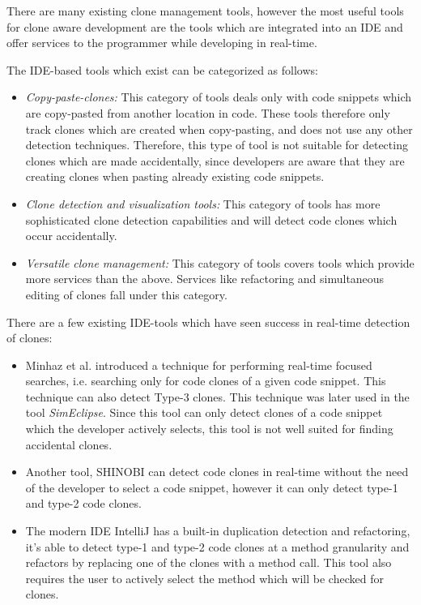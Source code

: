 \documentclass[12pt]{article}
\begin{document}
There are many existing clone management tools, however the most useful tools for clone
aware development are the tools which are integrated into an IDE and offer services to the
programmer while developing in real-time.

The IDE-based tools which exist can be categorized as
follows\cite[8]{Udding_Towards_Convenient_Management}:

\begin{itemize}
	\item\textit{Copy-paste-clones:} This category of tools deals only with code snippets which are
	copy-pasted from another location in code. These tools therefore only track clones which
	are created when copy-pasting, and does not use any other detection techniques. Therefore,
	this type of tool is not suitable for detecting clones which are made accidentally, since
	developers are aware that they are creating clones when pasting already existing code
	snippets.

	\item\textit{Clone detection and visualization tools:} This category of tools has more
	sophisticated clone detection capabilities and will detect code clones which occur
	accidentally.

	\item\textit{Versatile clone management:} This category of tools covers tools which provide more
	services than the above. Services like refactoring and simultaneous editing of clones fall
	under this category.
\end{itemize}

There are a few existing IDE-tools which have seen success in real-time detection of clones:

\begin{itemize}
	\item Minhaz et al. introduced a technique for performing real-time focused
	      searches, i.e. searching only for code clones of a given code snippet. This
	      technique can also detect Type-3 clones\cite{Zibran_real_time_search}.
	      This technique was later used in the tool
	      \textit{SimEclipse}\cite{Udding_Towards_Convenient_Management}. Since this tool
	      can only detect clones of a code snippet which the developer actively selects, this tool is
	      not well suited for finding accidental clones.

	\item Another tool, SHINOBI can detect code clones in real-time without the need
	      of the developer to select a code snippet, however it can only detect type-1
	      and type-2 code clones\cite{SHINOBI}.
	\item The modern IDE IntelliJ has a built-in duplication detection and
	      refactoring, it's able to detect type-1 and type-2 code clones at a method
	      granularity and refactors by replacing one of the clones with a method call.
	      This tool also requires the user to actively select the method which will be
	      checked for clones.
\end{itemize}
\end{document}
